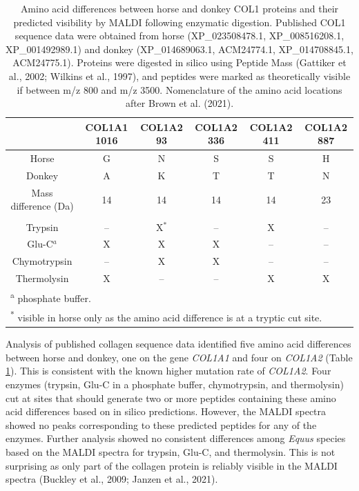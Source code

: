 \documentclass[preprint, 3p, authoryear]{elsarticle} %
\begin{document}
\begin{table}

\caption{\label{tab:eqtable2}Amino acid differences between horse and donkey COL1 proteins and their predicted visibility by MALDI following enzymatic digestion. Published COL1 sequence data were obtained from horse (XP\_023508478.1, XP\_008516208.1, XP\_001492989.1) and donkey (XP\_014689063.1, ACM24774.1, XP\_014708845.1, ACM24775.1). Proteins were digested in silico using Peptide Mass (Gattiker et al., 2002; Wilkins et al., 1997), and peptides were marked as theoretically visible if between m/z 800 and m/z 3500. Nomenclature of the amino acid locations after Brown et al. (2021).}
\centering
\begin{tabular}[t]{cccccc}
\toprule
  & COL1A1 1016 & COL1A2 93 & COL1A2 336 & COL1A2 411 & COL1A2 887\\
\midrule
Horse & G & N & S & S & H\\
Donkey & A & K & T & T & N\\
Mass difference (Da) & 14 & 14 & 14 & 14 & 23\\
\addlinespace[1em]
\multicolumn{6}{l}{\textbf{Predicted visibility by MALDI-TOF following enzymatic digestion}}\\
\hspace{1em}Trypsin & -- & X$^{*}$ & -- & X & --\\
\hspace{1em}Glu-C$^{a}$ & X & X & X & -- & --\\
\hspace{1em}Chymotrypsin & -- & X & X & -- & --\\
\hspace{1em}Thermolysin & X & -- & -- & X & X\\
\bottomrule
\multicolumn{6}{l}{\rule{0pt}{1em}\textsuperscript{a} phosphate buffer.}\\
\multicolumn{6}{l}{\rule{0pt}{1em}\textsuperscript{*} visible in horse only as the amino acid difference is at a tryptic cut site.}\\
\end{tabular}
\end{table}

Analysis of published collagen sequence data identified five amino acid differences between horse and donkey, one on the gene \emph{COL1A1} and four on \emph{COL1A2} (Table \ref{tab:eqtable2}). This is consistent with the known higher mutation rate of \emph{COL1A2}. Four enzymes (trypsin, Glu-C in a phosphate buffer, chymotrypsin, and thermolysin) cut at sites that should generate two or more peptides containing these amino acid differences based on in silico predictions. However, the MALDI spectra showed no peaks corresponding to these predicted peptides for any of the enzymes. Further analysis showed no consistent differences among \emph{Equus} species based on the MALDI spectra for trypsin, Glu-C, and thermolysin. This is not surprising as only part of the collagen protein is reliably visible in the MALDI spectra (Buckley et al., 2009; Janzen et al., 2021).
\end{document}
